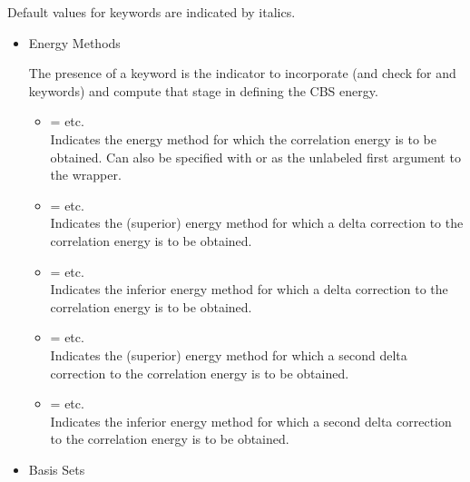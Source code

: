 
Default values for keywords are indicated by italics.

\begin{itemize}
\item Energy Methods

The presence of a  keyword is the indicator to incorporate (and check for
 and  keywords) and compute that stage in defining the CBS energy.
\begin{itemize}
\item[]  =  \textbar\;  \textbar\; etc. \\
Indicates the energy method for which the correlation energy is to be obtained. Can also be specified with 
or as the unlabeled first argument to the wrapper.
\item[]  =  \textbar\;  \textbar\; etc. \\
Indicates the (superior) energy method for which a delta correction to the correlation energy is to be obtained.
\item[]  = \textit{} \textbar\;  \textbar\; etc. \\
Indicates the inferior energy method for which a delta correction to the correlation energy is to be obtained.
\item[]  =  \textbar\;  \textbar\; etc. \\
Indicates the (superior) energy method for which a second delta correction to the correlation energy is to be obtained.
\item[]  = \textit{} \textbar\;  \textbar\; etc. \\
Indicates the inferior energy method for which a second delta correction to the correlation energy is to be obtained.
\end{itemize}

\item Basis Sets


\end{itemize}
